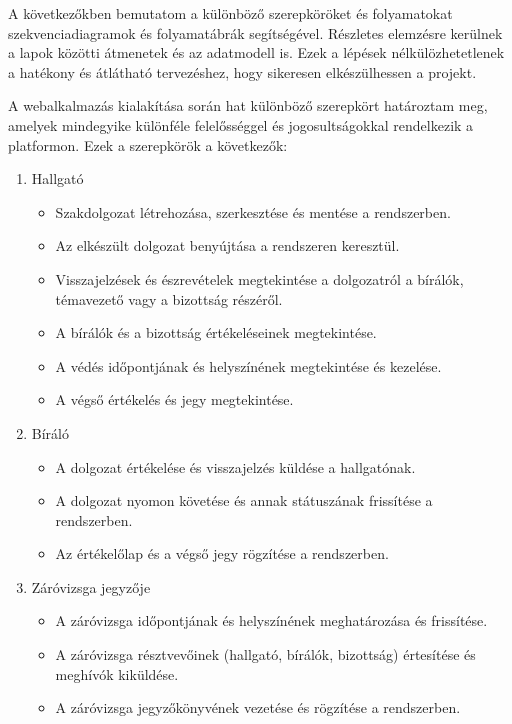 \label{Tervezés}

A következőkben bemutatom a különböző szerepköröket és folyamatokat szekvenciadiagramok és folyamatábrák segítségével. Részletes elemzésre kerülnek a lapok közötti átmenetek és az adatmodell is. Ezek a lépések nélkülözhetetlenek a hatékony és átlátható tervezéshez, hogy sikeresen elkészülhessen a projekt.


A webalkalmazás kialakítása során hat különböző szerepkört határoztam meg, amelyek mindegyike különféle felelősséggel és jogosultságokkal rendelkezik a platformon. Ezek a szerepkörök a következők:

\begin{enumerate}
\item Hallgató
\begin{itemize}
\item Szakdolgozat létrehozása, szerkesztése és mentése a rendszerben.
\item Az elkészült dolgozat benyújtása a rendszeren keresztül.
\item Visszajelzések és észrevételek megtekintése a dolgozatról a bírálók, témavezető vagy a bizottság részéről.
\item A bírálók és a bizottság értékeléseinek megtekintése.
\item A védés időpontjának és helyszínének megtekintése és kezelése.
\item A végső értékelés és jegy megtekintése.
\end{itemize}

\item Bíráló
\begin{itemize}
\item A dolgozat értékelése és visszajelzés küldése a hallgatónak.
\item A dolgozat nyomon követése és annak státuszának frissítése a rendszerben.
\item Az értékelőlap és a végső jegy rögzítése a rendszerben.
\end{itemize}

\item Záróvizsga jegyzője
\begin{itemize}
\item A záróvizsga időpontjának és helyszínének meghatározása és frissítése.
\item A záróvizsga résztvevőinek (hallgató, bírálók, bizottság) értesítése és meghívók kiküldése.
\item A záróvizsga jegyzőkönyvének vezetése és rögzítése a rendszerben.
\end{itemize}


\end{enumerate}
